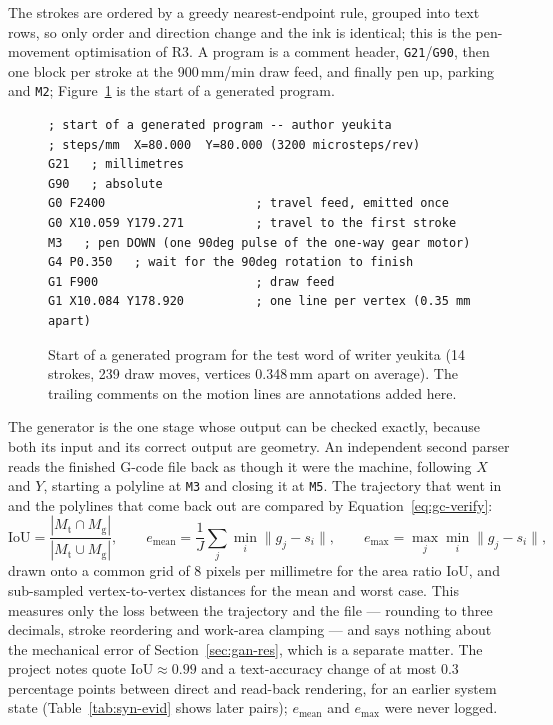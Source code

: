 The strokes are ordered by a greedy nearest-endpoint rule, grouped into text rows, so only order and direction change and the ink is identical; this is the pen-movement optimisation of R3. A program is a comment header, \texttt{G21}/\texttt{G90}, then one block per stroke at the 900\,mm/min draw feed, and finally pen up, parking and \texttt{M2}; Figure~\ref{fig:gc-emit} is the start of a generated program.

\begin{figure}[!htbp]
\centering
\fontsize{8}{9.2}\selectfont
\begin{lstlisting}[basicstyle=\ttfamily\fontsize{8}{9.2}\selectfont,frame=none]
; start of a generated program -- author yeukita
; steps/mm  X=80.000  Y=80.000 (3200 microsteps/rev)
G21   ; millimetres
G90   ; absolute
G0 F2400                     ; travel feed, emitted once
G0 X10.059 Y179.271          ; travel to the first stroke
M3   ; pen DOWN (one 90deg pulse of the one-way gear motor)
G4 P0.350   ; wait for the 90deg rotation to finish
G1 F900                      ; draw feed
G1 X10.084 Y178.920          ; one line per vertex (0.35 mm apart)
\end{lstlisting}
\caption{Start of a generated program for the test word of writer yeukita (14 strokes, 239 draw moves, vertices 0.348\,mm apart on average). The trailing comments on the motion lines are annotations added here.}
\label{fig:gc-emit}
\end{figure}

\label{sec:gc-verify}
The generator is the one stage whose output can be checked exactly, because both its input and its correct output are geometry. An independent second parser reads the finished G-code file back as though it were the machine, following $X$ and $Y$, starting a polyline at \texttt{M3} and closing it at \texttt{M5}. The trajectory that went in and the polylines that come back out are compared by Equation~\ref{eq:gc-verify}:
\begin{equation}
\mathrm{IoU}=\frac{|M_{\mathrm t}\cap M_{\mathrm g}|}{|M_{\mathrm t}\cup M_{\mathrm g}|},\qquad e_{\mathrm{mean}}=\frac{1}{J}\sum_j\min_i\lVert g_j-s_i\rVert,\qquad e_{\max}=\max_j\min_i\lVert g_j-s_i\rVert,
\label{eq:gc-verify}
\end{equation}
drawn onto a common grid of 8 pixels per millimetre for the area ratio $\mathrm{IoU}$, and sub-sampled vertex-to-vertex distances for the mean and worst case. This measures only the loss between the trajectory and the file --- rounding to three decimals, stroke reordering and work-area clamping --- and says nothing about the mechanical error of Section~\ref{sec:gan-res}, which is a separate matter. The project notes quote $\mathrm{IoU}\approx0.99$ and a text-accuracy change of at most 0.3 percentage points between direct and read-back rendering, for an earlier system state (Table~\ref{tab:syn-evid} shows later pairs); $e_{\mathrm{mean}}$ and $e_{\max}$ were never logged.

